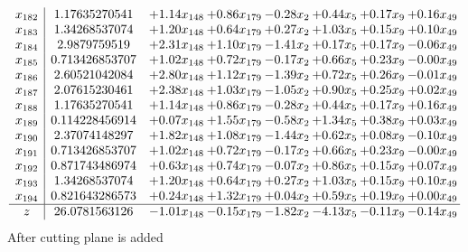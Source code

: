 \documentclass[8pt]{article}
\begin{document}
\[\begin{array}{c| c c@{\hskip 2pt} c@{\hskip 2pt} c@{\hskip 2pt} c@{\hskip 2pt} c@{\hskip 2pt} c@{\hskip 2pt} }
 x_{182}   &  1.17635270541 & +  1.14 x_{148} & +  0.86 x_{179} & -0.28 x_{2} & +  0.44 x_{5} & +  0.17 x_{9} & +  0.16 x_{49}\\
 x_{183}   &  1.34268537074 & +  1.20 x_{148} & +  0.64 x_{179} & +  0.27 x_{2} & +  1.03 x_{5} & +  0.15 x_{9} & +  0.10 x_{49}\\
 x_{184}   &  2.9879759519 & +  2.31 x_{148} & +  1.10 x_{179} & -1.41 x_{2} & +  0.17 x_{5} & +  0.17 x_{9} & -0.06 x_{49}\\
 x_{185}   &  0.713426853707 & +  1.02 x_{148} & +  0.72 x_{179} & -0.17 x_{2} & +  0.66 x_{5} & +  0.23 x_{9} & -0.00 x_{49}\\
 x_{186}   &  2.60521042084 & +  2.80 x_{148} & +  1.12 x_{179} & -1.39 x_{2} & +  0.72 x_{5} & +  0.26 x_{9} & -0.01 x_{49}\\
 x_{187}   &  2.07615230461 & +  2.38 x_{148} & +  1.03 x_{179} & -1.05 x_{2} & +  0.90 x_{5} & +  0.25 x_{9} & +  0.02 x_{49}\\
 x_{188}   &  1.17635270541 & +  1.14 x_{148} & +  0.86 x_{179} & -0.28 x_{2} & +  0.44 x_{5} & +  0.17 x_{9} & +  0.16 x_{49}\\
 x_{189}   &  0.114228456914 & +  0.07 x_{148} & +  1.55 x_{179} & -0.58 x_{2} & +  1.34 x_{5} & +  0.38 x_{9} & +  0.03 x_{49}\\
 x_{190}   &  2.37074148297 & +  1.82 x_{148} & +  1.08 x_{179} & -1.44 x_{2} & +  0.62 x_{5} & +  0.08 x_{9} & -0.10 x_{49}\\
 x_{191}   &  0.713426853707 & +  1.02 x_{148} & +  0.72 x_{179} & -0.17 x_{2} & +  0.66 x_{5} & +  0.23 x_{9} & -0.00 x_{49}\\
 x_{192}   &  0.871743486974 & +  0.63 x_{148} & +  0.74 x_{179} & -0.07 x_{2} & +  0.86 x_{5} & +  0.15 x_{9} & +  0.07 x_{49}\\
 x_{193}   &  1.34268537074 & +  1.20 x_{148} & +  0.64 x_{179} & +  0.27 x_{2} & +  1.03 x_{5} & +  0.15 x_{9} & +  0.10 x_{49}\\
 x_{194}   &  0.821643286573 & +  0.24 x_{148} & +  1.32 x_{179} & +  0.04 x_{2} & +  0.59 x_{5} & +  0.19 x_{9} & +  0.00 x_{49}\\
\hline
z    &  26.0781563126 & -1.01 x_{148} & -0.15 x_{179} & -1.82 x_{2} & -4.13 x_{5} & -0.11 x_{9} & -0.14 x_{49}\\
\end{array}\]
 After cutting plane is added 
\end{document}
